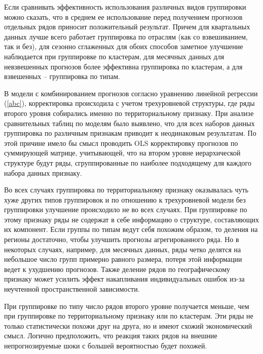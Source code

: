 \documentclass[12pt,a4paper, oneside]{extreport}
\begin{document}

Если сравнивать эффективность использования различных видов  группировки можно сказать, что  в среднем ее использование  перед получением прогнозов отдельных рядов приносит положительный результат. Причем для квартальных данных лучше всего работает группировка по отраслям (как со взвешиванием, так и без), для сезонно сглаженных для обоих способов  заметное улучшение наблюдается при группировке по кластерам,  для месячных данных для невзвешенных прогнозов более эффективна группировка по кластерам, а для взвешенных -- группировка по типам.

В модели с  комбинированием прогнозов согласно уравнению линейной регрессии (\ref{abc}),
корректировка происходила с учетом 
трехуровневой структуры, где ряды второго уровня собирались  именно по территориальному признаку. При анализе сравнительных таблиц по моделям было выявлено, что для всех наборов данных группировка по различным признакам приводит к неодинаковым результатам. По этой причине  имело бы смысл проводить OLS корректировку прогнозов по суммирующей матрице, учитывающей, что на втором уровне иерархической структуре будут ряды, сгруппированные по наиболее подходящему  для каждого набора данных признаку. 



Во всех случаях группировка по территориальному признаку оказывалась чуть хуже других типов группировок и по отношению к трехуровневой модели без группировки улучшение происходило не во всех случаях.  
При группировке по этому признаку ряды не содержат  в себе информацию о структуре, составляющих их компонент. Если группы по типам ведут себя похожим образом, то деления на регионы  достаточно, чтобы улучшить прогнозы агрегированного ряда.      Но в некоторых случаях, например, для месячных данных,  ряды четко делятся на  небольшое число групп примерно равного размера, потеря этой информации ведет к ухудшению прогнозов.  Также деление рядов по географическому признаку может  усилить эффект накапливания индивидуальных ошибок из-за неучтенной пространственной зависимости. 

При группировке по типу число рядов второго уровне получается меньше, чем при группировке по территориальному признаку или по кластерам.  Эти  ряды не только статистически   похожи друг на друга, но и имеют схожий экономический смысл. Логично предположить, что  реакция таких рядов  на внешние непрогнозируемые шоки с большей вероятностью будет похожей. 
\end{document}

